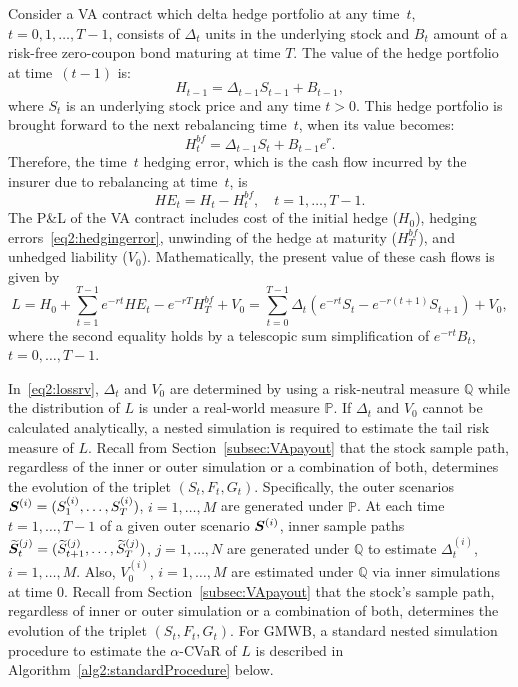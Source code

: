 Consider a VA contract which delta hedge portfolio at any time~$t$, $t=0,1,\ldots,T-1$, consists of $\Delta_t$ units in the underlying stock and $B_t$ amount of a risk-free zero-coupon bond maturing at time $T$.
The value of the hedge portfolio at time~$(t-1)$ is:
\begin{equation*}
    H_{t-1} = \Delta_{t-1} S_{t-1} + B_{t-1},
\end{equation*}
where $S_t$ is an underlying stock price and any time $t>0$.
This hedge portfolio is brought forward to the next rebalancing time~$t$, when its value becomes:
\begin{equation*}
    H_{t}^{bf} = \Delta_{t-1} S_{t} + B_{t-1}e^{r}.
\end{equation*}
Therefore, the time~$t$ hedging error, which is the cash flow incurred by the insurer due to rebalancing at time~$t$, is
\begin{equation}\label{eq2:hedgingerror}
    HE_t = H_t - H^{bf}_t, \quad t=1,\ldots, T-1.
\end{equation}
The P\&L of the VA contract includes cost of the initial hedge ($H_0$), hedging errors~\eqref{eq2:hedgingerror}, unwinding of the hedge at maturity ($H^{bf}_T$), and unhedged liability ($V_0$).
Mathematically, the present value of these cash flows is given by
\begin{equation}\label{eq2:lossrv}
L = H_0 + \sum_{t=1}^{T-1} e^{-rt} HE_t - e^{-rT} H^{bf}_T + V_0 = \sum_{t=0}^{T-1}\Delta_t (e^{-rt}S_t - e^{-r(t+1)}S_{t+1}) + V_0,
\end{equation}
where the second equality holds by a telescopic sum simplification of $e^{-rt}B_t$, $t=0,\ldots,T-1$.

In~\eqref{eq2:lossrv}, $\Delta_t$ and $V_0$ are determined by using a risk-neutral measure $\mathbb{Q}$ while the distribution of $L$ is under a real-world measure $\mathbb{P}$.
If $\Delta_t$ and $V_0$ cannot be calculated analytically, a nested simulation is required to estimate the tail risk measure of $L$.
Recall from Section~\ref{subsec:VApayout} that the stock sample path, regardless of the inner or outer simulation or a combination of both, determines the evolution of the triplet $(S_t,F_t,G_t)$.
Specifically, the outer scenarios $\bm{S}^{(i)} = (S_{1}^{(i)},\ldots,S_{T}^{(i)})$, $i=1,\ldots,M$ are generated under $\mathbb{P}$.
At each time~$t=1,\ldots,T-1$ of a given outer scenario $\bm{S}^{(i)}$, inner sample paths $\widetilde{\bm{S}}_{t}^{(j)} = (\widetilde{S}_{t+1}^{(j)},\ldots,\widetilde{S}_{T}^{(j)})$, $j=1,\ldots,N$ are generated under $\mathbb{Q}$ to estimate $\Delta_t^{(i)}$, $i=1,\ldots,M$.
Also, $V_0^{(i)}$, $i=1,\ldots,M$ are estimated under $\mathbb{Q}$ via inner simulations at time $0$.
Recall from Section~\ref{subsec:VApayout} that the stock's sample path, regardless of inner or outer simulation or a combination of both, determines the evolution of the triplet $(S_t,F_t,G_t)$.
For GMWB, a standard nested simulation procedure to estimate the $\alpha$-CVaR of $L$ is described in Algorithm~\ref{alg2:standardProcedure} below.

